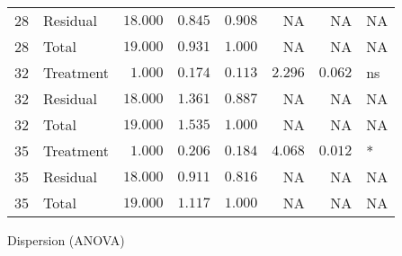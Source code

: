 \documentclass[
]{article}
\begin{document}
\begin{longtable}{rlrrrrrl}
28 & Residual & $18.000$ & $0.845$ & $0.908$ & NA & NA & NA \\ 
28 & Total & $19.000$ & $0.931$ & $1.000$ & NA & NA & NA \\ 
32 & Treatment & $1.000$ & $0.174$ & $0.113$ & $2.296$ & $0.062$ & ns \\ 
32 & Residual & $18.000$ & $1.361$ & $0.887$ & NA & NA & NA \\ 
32 & Total & $19.000$ & $1.535$ & $1.000$ & NA & NA & NA \\ 
35 & Treatment & $1.000$ & $0.206$ & $0.184$ & $4.068$ & $0.012$ & * \\ 
35 & Residual & $18.000$ & $0.911$ & $0.816$ & NA & NA & NA \\ 
35 & Total & $19.000$ & $1.117$ & $1.000$ & NA & NA & NA \\ 
\bottomrule
\end{longtable}

Dispersion (ANOVA)
\end{document}
